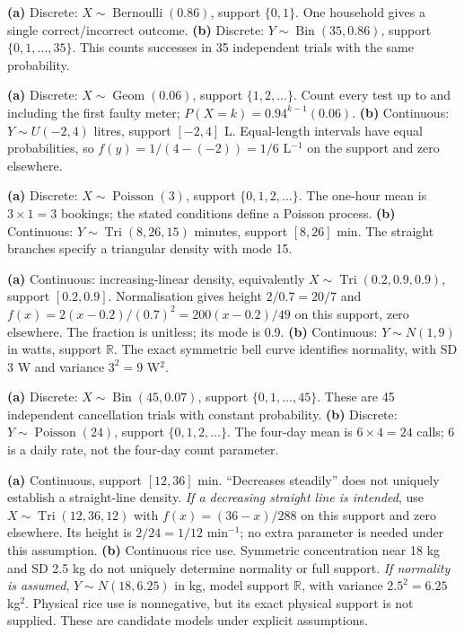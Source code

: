 \textbf{(a)} Discrete: $X\sim\operatorname{Bernoulli}(0.86)$, support $\{0,1\}$. One household gives a single correct/incorrect outcome.
\textbf{(b)} Discrete: $Y\sim\operatorname{Bin}(35,0.86)$, support $\{0,1,\ldots,35\}$. This counts successes in 35 independent trials with the same probability.

\textbf{(a)} Discrete: $X\sim\operatorname{Geom}(0.06)$, support $\{1,2,\ldots\}$. Count every test up to and including the first faulty meter; $P(X=k)=0.94^{k-1}(0.06)$.
\textbf{(b)} Continuous: $Y\sim U(-2,4)$ litres, support $[-2,4]$ L. Equal-length intervals have equal probabilities, so $f(y)=1/(4-(-2))=1/6$ L$^{-1}$ on the support and zero elsewhere.

\textbf{(a)} Discrete: $X\sim\operatorname{Poisson}(3)$, support $\{0,1,2,\ldots\}$. The one-hour mean is $3\times1=3$ bookings; the stated conditions define a Poisson process.
\textbf{(b)} Continuous: $Y\sim\operatorname{Tri}(8,26,15)$ minutes, support $[8,26]$ min. The straight branches specify a triangular density with mode 15.

\textbf{(a)} Continuous: increasing-linear density, equivalently $X\sim\operatorname{Tri}(0.2,0.9,0.9)$, support $[0.2,0.9]$. Normalisation gives height $2/0.7=20/7$ and $f(x)=2(x-0.2)/(0.7)^2=200(x-0.2)/49$ on this support, zero elsewhere. The fraction is unitless; its mode is 0.9.
\textbf{(b)} Continuous: $Y\sim N(1,9)$ in watts, support $\mathbb R$. The exact symmetric bell curve identifies normality, with SD 3 W and variance $3^2=9$ W$^2$.

\textbf{(a)} Discrete: $X\sim\operatorname{Bin}(45,0.07)$, support $\{0,1,\ldots,45\}$. These are 45 independent cancellation trials with constant probability.
\textbf{(b)} Discrete: $Y\sim\operatorname{Poisson}(24)$, support $\{0,1,2,\ldots\}$. The four-day mean is $6\times4=24$ calls; 6 is a daily rate, not the four-day count parameter.

\textbf{(a)} Continuous, support $[12,36]$ min. ``Decreases steadily'' does not uniquely establish a straight-line density. \emph{If a decreasing straight line is intended}, use $X\sim\operatorname{Tri}(12,36,12)$ with $f(x)=(36-x)/288$ on this support and zero elsewhere. Its height is $2/24=1/12$ min$^{-1}$; no extra parameter is needed under this assumption.
\textbf{(b)} Continuous rice use. Symmetric concentration near 18 kg and SD 2.5 kg do not uniquely determine normality or full support. \emph{If normality is assumed}, $Y\sim N(18,6.25)$ in kg, model support $\mathbb R$, with variance $2.5^2=6.25$ kg$^2$. Physical rice use is nonnegative, but its exact physical support is not supplied. These are candidate models under explicit assumptions.

